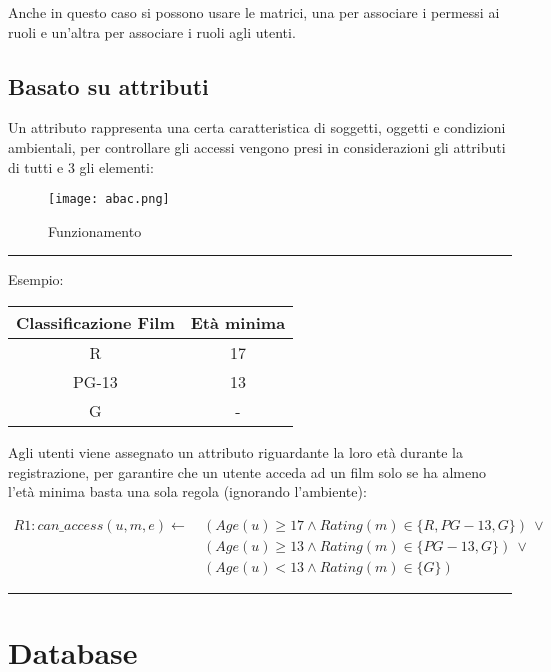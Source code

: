 \documentclass{article}
\begin{document}
\noindent Anche in questo caso si possono usare le matrici, una per associare i permessi ai ruoli e un'altra per associare i ruoli agli utenti.

\subsection{Basato su attributi}

Un attributo rappresenta una certa caratteristica di soggetti, oggetti e condizioni ambientali, per controllare gli accessi vengono presi in considerazioni gli attributi di tutti e 3 gli elementi:

\begin{figure}[ht]
    \centering
    \texttt{[image: abac.png]}
    \caption{Funzionamento}
\end{figure}

\noindent\rule{\textwidth}{0.5pt}
\noindent Esempio:

\begin{table}[ht]
    \centering
    \begin{tabular}{c|c}
        Classificazione Film & Età minima\\
         \hline
        R & 17\\
         PG-13& 13\\
        G & -\\
    \end{tabular}
\end{table}

\noindent Agli utenti viene assegnato un attributo riguardante la loro età durante la registrazione, per garantire che un utente acceda ad un film solo se ha almeno l'età minima basta una sola regola (ignorando l'ambiente):

\begin{equation}
    \nonumber
    \begin{split}
        R1:can\_access(u,m,e)\leftarrow\  & (Age(u)\geq17\wedge Rating(m)\in\{R,PG-13,G\})\ \vee \\
        & (Age(u)\geq13\wedge Rating(m)\in\{PG-13,G\})\ \vee\\
        & (Age(u)<13\wedge Rating(m)\in\{G\})
    \end{split}
\end{equation}

\noindent\rule{\textwidth}{0.5pt}

\section{Database}
\end{document}
